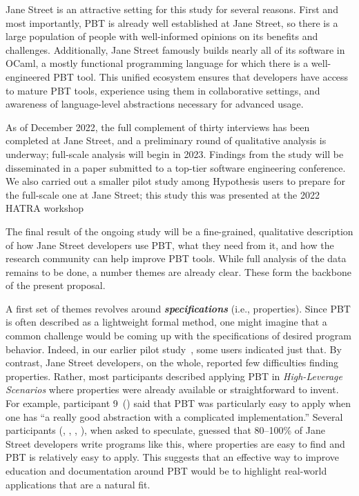 Jane Street is
an attractive setting for this study for several reasons.  First and most
importantly, PBT is
already well established at Jane Street, so there is a large
population of people with well-informed opinions on its benefits and
challenges. Additionally, Jane Street famously builds nearly all of its
software in OCaml, a mostly functional programming language for which
there is a well-engineered PBT tool. This unified
ecosystem ensures that developers have access to mature PBT tools,
experience using them in collaborative settings,
and awareness of language-level abstractions necessary
for advanced usage.

As of December 2022, the full complement of thirty interviews has been
completed at Jane Street, and a preliminary round of qualitative
analysis is underway; full-scale analysis will begin in 2023.
Findings from the study will be disseminated in a paper submitted to a
top-tier software engineering conference.  We also carried out a
smaller pilot study among Hypothesis users to prepare for the
full-scale one at Jane Street; this study this was presented at the
2022 HATRA workshop~\cite{goldstein_problems_2022}

 The final result of
the ongoing study will be a fine-grained, qualitative description of how
Jane Street developers use PBT, what they need from it, and how the
research community can
help improve PBT tools. While full analysis of the data remains
to be done, a number themes are already clear. These form the backbone
of the present proposal.

\newcommand{\proptheme}[1]{{\color{nord-orange} \em #1}}
\newcommand{\gentheme}[1]{{\color{nord-green} \em #1}}
\newcommand{\evaltheme}[1]{{\color{nord-purple} \em #1}}
\newcommand{\edutheme}[1]{{\color{nord-frost4} \em #1}}
A first set of
themes revolves around \proptheme{\normalfont \bf specifications} (i.e.,
properties).
Since
PBT is often described as a lightweight formal method, one
might imagine that a common challenge would be coming up with the
specifications of desired program behavior. Indeed, in our earlier pilot
study~\cite{ref:goldstein2022some}, some users indicated just that.
By contrast, Jane Street developers, on the whole, reported
few difficulties finding
properties. Rather, most participants described applying PBT in
\proptheme{High-Leverage Scenarios} where properties were already
available or straightforward to invent. For example, participant
9~() said that PBT was particularly easy to apply when one
has ``a really good abstraction with a complicated implementation.''
Several participants (, ,
, ), when asked to speculate, guessed
that 80--100\% of Jane Street
developers write programs like this, where properties are easy to find and
PBT is relatively easy to apply.  This suggests that an effective way to
improve education and documentation around PBT would be to highlight
real-world applications that are a natural fit.

